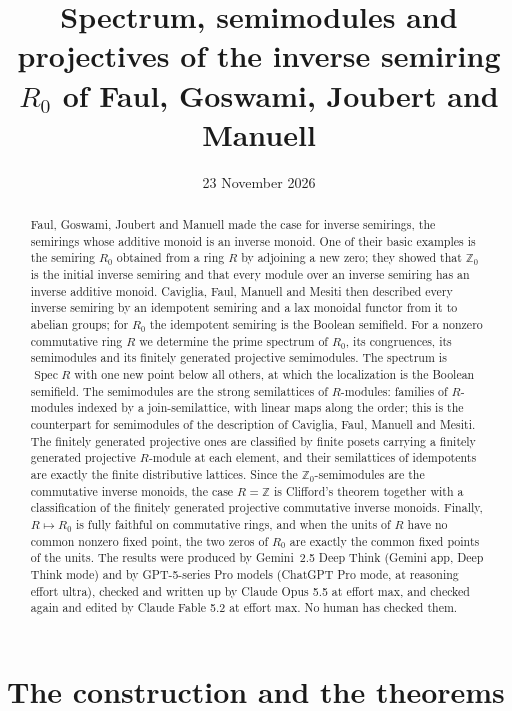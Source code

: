 \documentclass[11pt]{amsart}
\title[Spectrum, semimodules and projectives of $R_0$]{Spectrum, semimodules and projectives of the inverse semiring $R_0$ of Faul, Goswami, Joubert and Manuell}
\author{}
\date{23 November 2026}
\theoremstyle{remark}
\DeclareMathOperator{\Spec}{Spec}
\begin{document}
\begin{abstract}
Faul, Goswami, Joubert and Manuell made the case for inverse semirings, the semirings whose additive monoid is an inverse monoid. One of their basic examples is the semiring $R_0$ obtained from a ring $R$ by adjoining a new zero; they showed that $\mathbb Z_0$ is the initial inverse semiring and that every module over an inverse semiring has an inverse additive monoid. Caviglia, Faul, Manuell and Mesiti then described every inverse semiring by an idempotent semiring and a lax monoidal functor from it to abelian groups; for $R_0$ the idempotent semiring is the Boolean semifield. For a nonzero commutative ring $R$ we determine the prime spectrum of $R_0$, its congruences, its semimodules and its finitely generated projective semimodules. The spectrum is $\Spec R$ with one new point below all others, at which the localization is the Boolean semifield. The semimodules are the strong semilattices of $R$-modules: families of $R$-modules indexed by a join-semilattice, with linear maps along the order; this is the counterpart for semimodules of the description of Caviglia, Faul, Manuell and Mesiti. The finitely generated projective ones are classified by finite posets carrying a finitely generated projective $R$-module at each element, and their semilattices of idempotents are exactly the finite distributive lattices. Since the $\mathbb Z_0$-semimodules are the commutative inverse monoids, the case $R=\mathbb Z$ is Clifford's theorem together with a classification of the finitely generated projective commutative inverse monoids. Finally, $R\mapsto R_0$ is fully faithful on commutative rings, and when the units of $R$ have no common nonzero fixed point, the two zeros of $R_0$ are exactly the common fixed points of the units. The results were produced by Gemini~2.5 Deep Think (Gemini app, Deep Think mode) and by GPT-5-series Pro models (ChatGPT Pro mode, at reasoning effort ultra), checked and written up by Claude Opus 5.5 at effort max, and checked again and edited by Claude Fable 5.2 at effort max. No human has checked them.
\end{abstract}

\maketitle

\section{The construction and the theorems}
\end{document}

